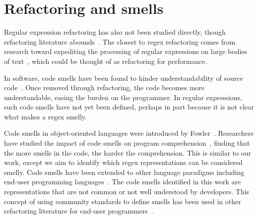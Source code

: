 \section{Refactoring and smells}

Regular expression refactoring has also not been studied directly, though refactoring literature abounds~\cite{Mens:2004:SSR:972215.972286, Opdyke:1992:ROF:169783, Griswold:1993:AAP:152388.152389}.
The closest to regex refactoring comes from research toward  expediting the processing of regular expressions on large bodies of text~\cite{Baeza-Yates:1996:FTS:235809.235810}, which could be thought of as refactoring for performance.


In software, code smells have been found to hinder understandability of source code~\cite{abbes2011empirical, du2006does}.
Once removed through refactoring, the code becomes more understandable, easing the burden on the programmer.
In regular expressions, such code smells have not yet been defined, perhaps in part because it is not clear what makes a regex smelly.

Code smells in object-oriented languages were introduced by Fowler~\cite{Fowl1999}. Researchers have studied the impact of code smells on program comprehension~\cite{abbes2011empirical, du2006does}, finding that the more smells in the code, the harder the comprehension. This is similar to our work, except we aim to identify which  regex representations can be considered smelly.
Code smells have been extended to other language paradigms including end-user programming languages~\cite{Hermans2012intra, Hermans2012intraExt, stoleeicse, stoleeTSE}. The code smells identified in this work are representations that are not common or not well understood by developers. This concept of using community standards to define smells has been used in other refactoring literature  for end-user programmers~\cite{stoleeicse, stoleeTSE}.
